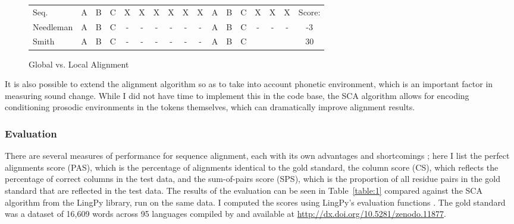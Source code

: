 \documentclass[doc,natbib,11pt]{apa6}
\begin{document}
\begin{figure}[b]
	
	\begin{tabular}{|l||ccccccccccccccc||c|}
		\hline
		Seq. & A&B&C&X&X&X&X&X&X&A&B&C&X&X&X&Score:\\
		Needleman & A&B&C&-&-&-&-&-&-&A&B&C&-&-&-&-3\\
		Smith & A&B&C&-&-&-&-&-&-&A&B&C&&&&30\\\hline
	\end{tabular}
	\caption{Global vs. Local Alignment}
	\label{figure:1}
\end{figure}



It is also possible to extend the alignment algorithm so as to take into account phonetic environment, which is an important factor in measuring sound change. While I did not have time to implement this in the code base, the SCA algorithm allows for encoding conditioning prosodic environments in the tokens themselves, which can dramatically improve alignment results.

\subsubsection{Evaluation}

There are several measures of performance for sequence alignment, each with its own advantages and shortcomings \citep{List2012b}; here I list the perfect alignments score (PAS), which is the percentage of alignments identical to the gold standard, the column score (CS), which reflects the percentage of correct columns in the test data, and the sum-of-pairs score (SPS), which is the proportion of all residue pairs in the gold standard that are reflected in the test data. The results of the evaluation can be seen in Table~\ref{table:1} compared against the SCA algorithm from the LingPy library, run on the same data. I computed the scores using LingPy's evaluation functions \citep{List2016}. The gold standard was a dataset of 16,609 words across 95 languages compiled by \citet{List2014} and available at \url{http://dx.doi.org/10.5281/zenodo.11877}.
\begin{table}[h]
\end{table}
\end{document}
